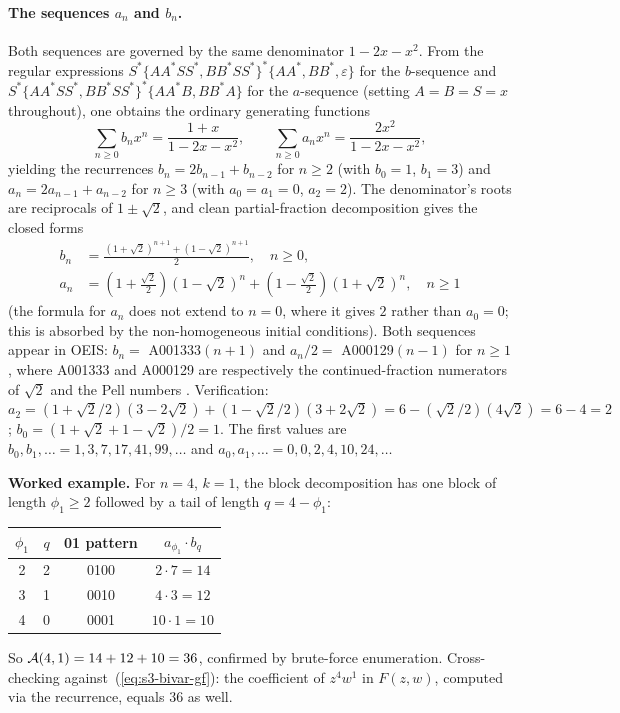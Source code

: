 \documentclass[11pt]{article}
\newcommand{\cA}{ {\cal A} }
\begin{document}
\paragraph{The sequences $a_n$ and $b_n$.} Both sequences are governed by the same denominator $1 - 2x - x^2$. From the regular expressions $S^* \{AA^* SS^*, BB^* SS^*\}^* \{AA^*, BB^*, \varepsilon\}$ for the $b$-sequence and $S^* \{AA^* SS^*, BB^* SS^*\}^* \{AA^*B, BB^*A\}$ for the $a$-sequence (setting $A = B = S = x$ throughout), one obtains the ordinary generating functions
\[
\sum_{n \ge 0} b_n x^n = \frac{1 + x}{1 - 2x - x^2}, \qquad \sum_{n \ge 0} a_n x^n = \frac{2 x^2}{1 - 2x - x^2},
\]
yielding the recurrences $b_n = 2 b_{n-1} + b_{n-2}$ for $n \ge 2$ (with $b_0 = 1$, $b_1 = 3$) and $a_n = 2 a_{n-1} + a_{n-2}$ for $n \ge 3$ (with $a_0 = a_1 = 0$, $a_2 = 2$). The denominator's roots are reciprocals of $1 \pm \sqrt{2}$, and clean partial-fraction decomposition gives the closed forms
\begin{align}
b_n &= \frac{(1 + \sqrt{2})^{n+1} + (1 - \sqrt{2})^{n+1}}{2}, \quad n \ge 0, \label{eq:s3-bn-closed} \\[4pt]
a_n &= \left(1 + \tfrac{\sqrt{2}}{2}\right)(1 - \sqrt{2})^n + \left(1 - \tfrac{\sqrt{2}}{2}\right)(1 + \sqrt{2})^n, \quad n \ge 1 \label{eq:s3-an-closed}
\end{align}
(the formula for $a_n$ does not extend to $n = 0$, where it gives $2$ rather than $a_0=0$; this is absorbed by the non-homogeneous initial conditions). Both sequences appear in OEIS: $b_n = $ A001333$(n+1)$ and $a_n / 2 = $ A000129$(n-1)$ for $n \ge 1$, where A001333 and A000129 are respectively the continued-fraction numerators of $\sqrt{2}$ and the Pell numbers \cite{oeisA001333,oeisA000129}. Verification: $a_2 = (1 + \sqrt{2}/2)(3 - 2\sqrt{2}) + (1 - \sqrt{2}/2)(3 + 2\sqrt{2}) = 6 - (\sqrt{2}/2)(4\sqrt{2}) = 6 - 4 = 2$; $b_0 = (1+\sqrt{2} + 1-\sqrt{2})/2 = 1$. The first values are $b_0, b_1, \ldots = 1, 3, 7, 17, 41, 99, \ldots$ and $a_0, a_1, \ldots = 0, 0, 2, 4, 10, 24, \ldots$

\textbf{Worked example.} For $n = 4$, $k = 1$, the block decomposition has one block of length $\phi_1 \ge 2$ followed by a tail of length $q = 4 - \phi_1$:
\begin{center}
\begin{tabular}{cccc}
$\phi_1$ & $q$ & 01 pattern & $a_{\phi_1} \cdot b_q$ \\
\hline
2 & 2 & 0100 & $2 \cdot 7 = 14$ \\
3 & 1 & 0010 & $4 \cdot 3 = 12$ \\
4 & 0 & 0001 & $10 \cdot 1 = 10$ \\
\end{tabular}
\end{center}
So $\cA(4,1) = 14 + 12 + 10 = 36$, confirmed by brute-force enumeration. Cross-checking against~(\ref{eq:s3-bivar-gf}): the coefficient of $z^4 w^1$ in $F(z, w)$, computed via the recurrence, equals $36$ as well.
\end{document}
